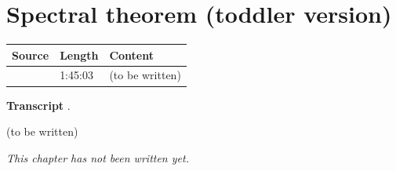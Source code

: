 \chapter{Spectral theorem (toddler version)}\label{ch:c06}
\begin{paracol}{2}

\begin{sources}
\begin{tabularx}{\linewidth}{@{}l l L@{}}
\toprule
\textbf{Source} & \textbf{Length} & \textbf{Content}\\
\midrule
{} & 1:45:03 & (to be written)\\
\bottomrule
\end{tabularx}

\smallskip
\textbf{Transcript} .
\end{sources}

\begin{reading}
(to be written)
\end{reading}

\emph{This chapter has not been written yet.}

\flushside
\end{paracol}
